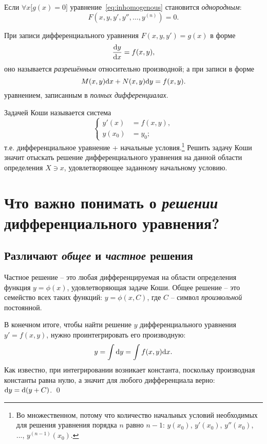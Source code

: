 \documentclass[12pt]{report}
\begin{document}
Если $\forall x \Big[g(x)= 0\Big]$ уравнение~\eqref{eq:inhomogenous} становится \emph{однородным}:
\begin{equation}\label{eq:homogenous}
F\left(x,y,y',y'',\dots, y^{(n)}\right) = 0.
\end{equation}

\begin{rmk}
	При записи дифференциального уравнения $F(x,y,y') = g(x)$ в форме
	\begin{equation*}
	\frac{\mathrm d y}{\mathrm d x} = f(x,y),
	\end{equation*}
	оно называется \emph{разрешённым} относительно производной; а при записи в форме
	\begin{equation*}
	M(x,y)\mathrm d x + N(x,y)\mathrm d y = f(x,y).
	\end{equation*}
	уравнением, записанным в \emph{полных дифференциалах}.
\end{rmk}

\begin{defn}
	Задачей Коши называется система
	\begin{equation}\label{eq:Cauchy}
		\begin{cases}
		y'(x) &= f(x,y), \\
		y(x_0) &= y_0;
		\end{cases}
	\end{equation}
	т.е. дифференциальное уравнение + начальные условия.\footnote{Во множественном, потому что количество начальных условий необходимых для решения уравнения порядка $n$ равно $n-1$: $y(x_0)$, $y'(x_0)$, $y''(x_0)$, ..., $y^{(n-1)}(x_0)$.} Решить задачу Коши значит отыскать решение дифференциального уравнения на данной области определения $X\ni x$, удовлетворяющее заданному начальному условию.
\end{defn}

\section{Что важно понимать о \emph{решении} дифференциального уравнения?}
\subsection{Различают \emph{общее} и \emph{частное} решения}
Частное решение -- это любая дифференцируемая на области определения функция $y = \phi(x)$, удовлетворяющая задаче Коши. Общее решение -- это семейство всех таких функций: $y = \phi(x, C)$, где $C$ -- символ \emph{произвольной} постоянной.
\begin{rmk}
	В конечном итоге, чтобы найти решение $y$ дифференциального уравнения $y' = f(x,y)$, нужно проинтегрировать его производную: 
	\[
		y = \int \mathrm d y = \int f(x,y)\mathrm d x.
	\]
	Как известно, при интегрировании возникает константа, поскольку производная константы равна нулю, а значит для любого дифференциала верно: $\mathrm d y = \mathrm d(y + C)$. \qed
\end{rmk}
\end{document}
